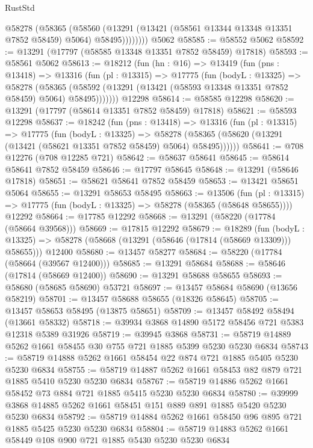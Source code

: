 \begin{lexlean}{RustStd}
\begin{coremodule}
            @58278
              (@58365
                (@58560
                  (@13291 (@13421 (@58561 @13344 @13348 @13351 @7852 @58459) @5064) @58495))))))))
    @5062
@58585 := @58552 @5062
@58592 := @13291 (@17797 (@58585 @13348 @13351 @7852 @58459) @17818)
@58593 := @58561 @5062
@58613 := @18212
    (fun (hn : @16) =>
    @13419
      (fun (pns : @13418) =>
      @13316
        (fun (pl : @13315) =>
        @17775
          (fun (bodyL : @13325) =>
          @58278
            (@58365 (@58592 (@13291 (@13421 (@58593 @13348 @13351 @7852 @58459) @5064) @58495)))))))
    @12298
@58614 := @58585 @12298
@58620 := @13291 (@17797 (@58614 @13351 @7852 @58459) @17818)
@58621 := @58593 @12298
@58637 := @18242
    (fun (pns : @13418) =>
    @13316
      (fun (pl : @13315) =>
      @17775
        (fun (bodyL : @13325) =>
        @58278 (@58365 (@58620 (@13291 (@13421 (@58621 @13351 @7852 @58459) @5064) @58495))))))
@58641 := @708 @12276 (@708 @12285 @721)
@58642 := @58637 @58641
@58645 := @58614 @58641 @7852 @58459
@58646 := @17797 @58645
@58648 := @13291 (@58646 @17818)
@58651 := @58621 @58641 @7852 @58459
@58653 := @13421 @58651 @5064
@58655 := @13291 @58653 @58495
@58663 := @13506
    (fun (pl : @13315) => @17775 (fun (bodyL : @13325) => @58278 (@58365 (@58648 @58655))))
    @12292
@58664 := @17785 @12292
@58668 := @13291 (@58220 (@17784 (@58664 @39568)))
@58669 := @17815 @12292
@58679 := @18289
    (fun (bodyL : @13325) => @58278 (@58668 (@13291 (@58646 (@17814 (@58669 @13309))) @58655)))
    @12400
@58680 := @13457 @58277
@58684 := @58220 (@17784 (@58664 (@39567 @12400)))
@58685 := @13291 @58684
@58688 := @58646 (@17814 (@58669 @12400))
@58690 := @13291 @58688 @58655
@58693 := @58680 (@58685 @58690) @53721
@58697 := @13457 @58684 @58690 (@13656 @58219)
@58701 := @13457 @58688 @58655 (@18326 @58645)
@58705 := @13457 @58653 @58495 (@13875 @58651)
@58709 := @13457 @58492 @58494 (@13661 @58332)
@58718 := @39934 @3868 @14890 @5172 @58456 @721 @5383 @12318 @5389 @31926
@58719 := @39945 @3868
@58731 := @58719 @14889 @5262 @1661 @58455 @30 @755 @721 @1885 @5399 @5230 @5230 @6834
@58743 := @58719 @14888 @5262 @1661 @58454 @22 @874 @721 @1885 @5405 @5230 @5230 @6834
@58755 := @58719 @14887 @5262 @1661 @58453 @82 @879 @721 @1885 @5410 @5230 @5230 @6834
@58767 := @58719 @14886 @5262 @1661 @58452 @73 @884 @721 @1885 @5415 @5230 @5230 @6834
@58780 := @39999 @3868 @14885 @5262 @1661 @58451 @151 @889 @891 @1885 @5420 @5230 @5230 @6834
@58792 := @58719 @14884 @5262 @1661 @58450 @96 @895 @721 @1885 @5425 @5230 @5230 @6834
@58804 := @58719 @14883 @5262 @1661 @58449 @108 @900 @721 @1885 @5430 @5230 @5230 @6834

\end{coremodule}
\end{lexlean}
